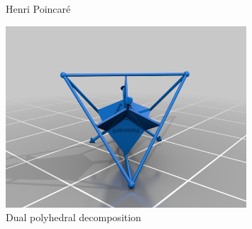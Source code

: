 \documentclass[landscape,a0paper]{baposter}
\begin{document}
\begin{poster}
{\begin{figure}[H]
\begin{minipage}[b]{0.45\textwidth}
\caption{Henri Poincar\'e}
\end{minipage}
\begin{minipage}[b]{0.45\textwidth} %
\centering %
\includegraphics[width=0.8\textwidth]{PD.png}%
\caption{Dual polyhedral decomposition}
\end{minipage}
\end{figure}
    }


\end{poster}
\end{document}
